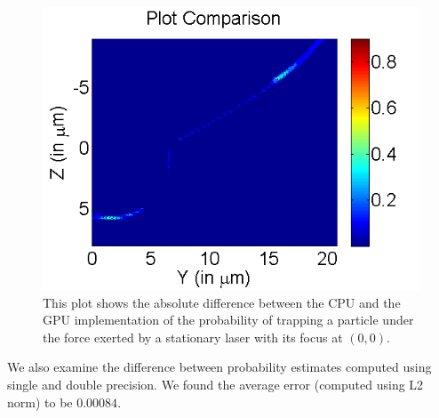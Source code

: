 \begin{figure}[htb!]
\includegraphics[width=\columnwidth]{figures/absolute_error}
\caption{
This plot shows the absolute difference between the CPU and the 
GPU implementation of the probability of trapping a particle under 
the force exerted by a stationary laser with its focus at $(0,0)$.
}
\label{fig:trapping-prob-static-cpu-gpu-error}
\end{figure}


We also examine the difference between probability estimates computed 
using single and double precision. We found the average error 
(computed using L2 norm) to be $ 0.00084$.


%
%
%


